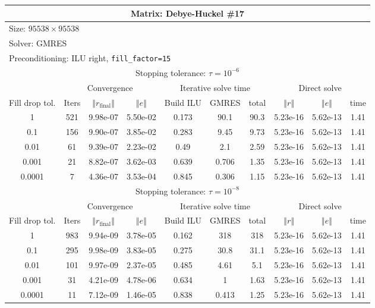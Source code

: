 \documentclass[oneside,final]{amsart}  %
\begin{document}
\begin{tabular}{|c|c|c|c|c|c|c|c|c|c|}
\hline
\multicolumn{10}{|c|}{Matrix: Debye-Huckel \#17}\tabularnewline
\hline
  \multicolumn{10}{|l|}{Size: $95538\times95538$}\tabularnewline
\hline
\multicolumn{10}{|l|}{Solver: GMRES}\tabularnewline
\hline
\multicolumn{10}{|l|}{Preconditioning: ILU right, \texttt{fill\_factor=15}}\tabularnewline
\hline
\hline
\multicolumn{10}{|c|}{Stopping tolerance: $\tau=10^{-6}$}\tabularnewline
\hline
\hline
 & \multicolumn{3}{c|}{Convergence} & \multicolumn{3}{c|}{Iterative solve time} & \multicolumn{3}{c|}{Direct solve}\tabularnewline
\hline
Fill drop tol.  & Iters & $\left\Vert r_{\text{final}}\right\Vert $  & $\left\Vert e\right\Vert $  & Build ILU  & GMRES  & total  & $\left\Vert r\right\Vert $ & $\left\Vert e\right\Vert $  & time\tabularnewline
\hline
1      & 521 & 9.98e-07 & 5.50e-02 &   0.173 &    90.1 &    90.3 & 5.23e-16 & 5.62e-13 &      1.41\\
  \hline
0.1    & 156 & 9.90e-07 & 3.85e-02 &   0.283 &    9.45 &    9.73 & 5.23e-16 & 5.62e-13 &      1.41\\
  \hline
0.01   & 61  & 9.39e-07 & 2.23e-02 &    0.49 &     2.1 &    2.59 & 5.23e-16 & 5.62e-13 &      1.41\\
  \hline
0.001  & 21  & 8.82e-07 & 3.62e-03 &   0.639 &   0.706 &    1.35 & 5.23e-16 & 5.62e-13 &      1.41\\
  \hline
0.0001 & 7   & 4.36e-07 & 3.53e-04 &   0.845 &   0.306 &    1.15 & 5.23e-16 & 5.62e-13 &      1.41\\
  \hline
\hline
\multicolumn{10}{|c|}{Stopping tolerance: $\tau=10^{-8}$}\tabularnewline
\hline
\hline
 & \multicolumn{3}{c|}{Convergence} & \multicolumn{3}{c|}{Iterative solve time} & \multicolumn{3}{c|}{Direct solve }\tabularnewline
\hline
Fill drop tol.  & Iters  & $\left\Vert r_{\text{final}}\right\Vert $  & $\left\Vert e\right\Vert $ & Build ILU  & GMRES  & total  & $\left\Vert r\right\Vert $  & $\left\Vert e\right\Vert $  & time\tabularnewline
\hline
1      & 983 & 9.94e-09 & 3.78e-05 &   0.162 &     318 &     318 & 5.23e-16 & 5.62e-13 &      1.41\\
  \hline
0.1    & 295 & 9.98e-09 & 3.83e-05 &   0.275 &    30.8 &    31.1 & 5.23e-16 & 5.62e-13 &      1.41\\
  \hline
0.01   & 101 & 9.97e-09 & 2.37e-05 &   0.485 &    4.61 &     5.1 & 5.23e-16 & 5.62e-13 &      1.41\\
  \hline
0.001  & 31  & 4.21e-09 & 4.78e-06 &   0.634 &       1 &    1.63 & 5.23e-16 & 5.62e-13 &      1.41\\
  \hline
0.0001 & 11  & 7.12e-09 & 1.46e-05 &   0.838 &   0.413 &    1.25 & 5.23e-16 & 5.62e-13 &      1.41\\
  \hline
\end{tabular}
\end{document}
